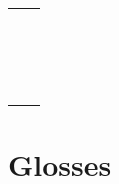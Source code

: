 \documentclass{article}
\begin{document}
\begin{table}[H]
\begin{tabular}{ll}
    \ipa{} & \\
    \ipa{} & \\
    \ipa{} & \\
    \ipa{} & \\
    \ipa{} & \\
    \ipa{} & \\
    \ipa{} & \\
    \ipa{} & \\
    \ipa{} & \\
    \ipa{} & \\
    \ipa{} & \\
    \ipa{} & \\
    \ipa{} & \\
    \ipa{} & \\
    \ipa{} & \\
    \ipa{} & \\
  \end{tabular}
\end{table}

\newpage\section{Glosses}
\end{document}
